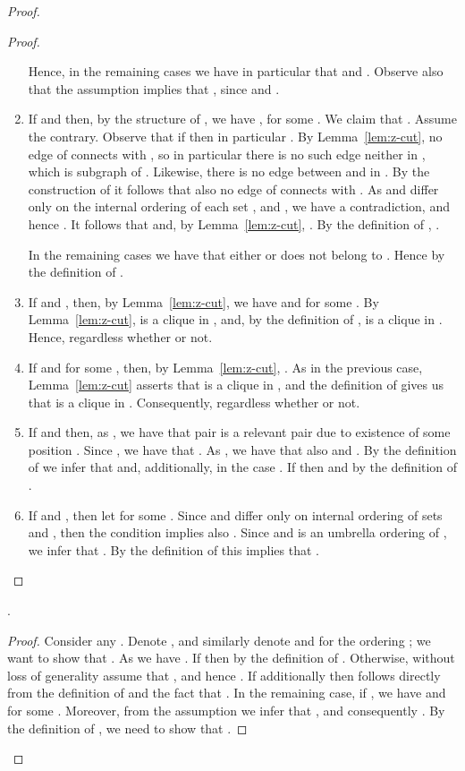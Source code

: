 \begin{proof}
\begin{proof}
\begin{enumerate}
Hence, in the remaining cases we have in particular that  and . Observe also that the assumption  implies that , since  and .

\item If  and  then, by the structure of , we have ,  for some . We claim that . Assume the contrary. Observe that if  then in particular .
By Lemma~\ref{lem:z-cut}, no edge of  connects  with , so in particular there is no such edge neither in , which is subgraph of . Likewise, there is no edge between  and  in . By the construction of  it follows that also no edge of  connects  with .
As  and  differ only on the internal ordering of each set , and , we have a contradiction,
and hence .
It follows that  and, by Lemma~\ref{lem:z-cut}, .
  By the definition of , .

In the remaining cases we have that either  or  does not belong to . Hence  by the definition of .

\item If  and , then, by Lemma~\ref{lem:z-cut}, we have 
and  for some . By Lemma~\ref{lem:z-cut},
 is a clique in , and, by the definition of ,
 is a clique in . Hence,  regardless whether  or not.
\item If  and  for some , then, by Lemma~\ref{lem:z-cut},
  . As in the previous case, Lemma~\ref{lem:z-cut} asserts that 
 is a clique in , and the definition of 
gives us that  is a clique in . Consequently,   regardless whether  or not.
\item If  and  then, as , we have that pair  is 
a relevant pair due to existence of some position . Since , we have that .
As , we have that also  and . By the definition of  we infer that  and, additionally,  in the case .
If  then  and  by the definition of .
\item If  and , then let  for some
. Since  and  differ only on internal ordering of sets  and , then the condition  implies also . Since  and  is an umbrella ordering of , we infer that . By the definition of  this implies that .
\end{enumerate}
\cqed\end{proof}

\begin{claim}\label{cl:layer-two:Gdown}
.
\end{claim}
\begin{proof}
Consider any .
Denote ,  and similarly denote  and  for the ordering ; we want to show that .
As  we have .
If  then  by the definition of .
Otherwise, without loss of generality assume that , and hence .
If additionally  then  follows directly from the definition of  and the fact that .
In the remaining case, if , we have  and  for some
. Moreover, from the assumption  we infer that , and consequently .
By the definition of , we need to show that .


\end{proof}
\end{proof}
